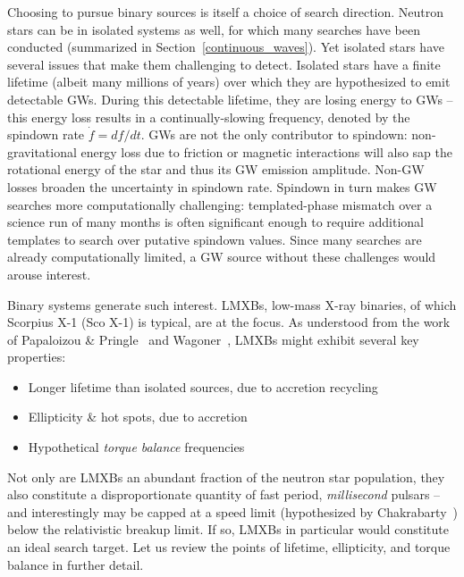 Choosing to pursue binary sources is itself a choice of search direction.
Neutron stars can be in isolated systems as well, for which many searches have been conducted (summarized in Section~\ref{continuous_waves}).
Yet isolated stars have several issues that make them challenging to detect.
Isolated stars have a finite lifetime (albeit many millions of years) over which they are hypothesized to emit detectable GWs.
During this detectable lifetime, they are losing energy to GWs -- this energy loss results in a continually-slowing frequency, denoted by the spindown rate $\dot{f} = df /dt$.
GWs are not the only contributor to spindown: non-gravitational energy loss due to friction or magnetic interactions will also sap the rotational energy of the star and thus its GW emission amplitude.
Non-GW losses broaden the uncertainty in spindown rate.
Spindown in turn makes GW searches more computationally challenging: templated-phase mismatch over a science run of many months is often significant enough to require additional templates to search over putative spindown values. 
Since many searches are already computationally limited, a GW source without these challenges would arouse interest.

Binary systems generate such interest.
LMXBs, low-mass X-ray binaries, of which Scorpius X-1 (Sco X-1) is typical, are at the focus.
As understood from the work of Papaloizou \& Pringle~\cite{PapaloizouPringle1978} and Wagoner~\cite{Wagoner1984}, LMXBs might exhibit several key properties:

\begin{itemize}
\item Longer lifetime than isolated sources, due to accretion recycling
\item Ellipticity \& hot spots, due to accretion
\item Hypothetical \textit{torque balance} frequencies
\end{itemize}

Not only are LMXBs an abundant fraction of the neutron star population, they also constitute a disproportionate quantity of fast period, \textit{millisecond} pulsars -- and interestingly may be capped at a speed limit (hypothesized by Chakrabarty~\cite{Chakrabarty2003}) below the relativistic breakup limit.
If so, LMXBs in particular would constitute an ideal search target.
Let us review the points of lifetime, ellipticity, and torque balance in further detail.



